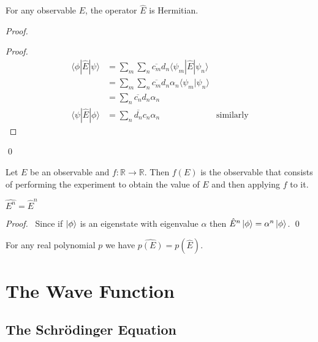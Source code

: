 \begin{prop}
For any observable $E$, the operator $\hat{E}$ is Hermitian.
\end{prop}

\begin{proof}
\pf
{}
\begin{proof}
	\pf
	\begin{align*}
		\langle \phi | \hat{E} | \psi \rangle
		& = \sum_m \sum_n \overline{c_m} d_n \langle \psi_m | \hat{E} | \psi_n \rangle \\
		& = \sum_m \sum_n \overline{c_m} d_n \alpha_n \langle \psi_m | \psi_n \rangle \\
		& = \sum_n \overline{c_n} d_n \alpha_n \\
		\langle \psi | \hat{E} | \phi \rangle & = \sum_n \overline{d_n} c_n \alpha_n & \text{similarly}
	\end{align*}
\end{proof}
\qed
\end{proof}

\begin{df}
Let $E$ be an observable and $f : \mathbb{R} \rightarrow \mathbb{R}$. Then $f(E)$ is the observable that consists of performing the experiment to obtain the value of $E$ and then applying $f$ to it.
\end{df}

\begin{prop}
$\widehat{E^n} = \hat{E}^n$
\end{prop}

\begin{proof}
\pf\ Since if $\left| {\phi} \right\rangle$ is an eigenstate with eigenvalue $\alpha$ then $\hat{E}^n \left| {\phi} \right\rangle = \alpha^n \left| {\phi} \right\rangle$. \qed
\end{proof}

\begin{cor}
For any real polynomial $p$ we have $\widehat{p(E)} = p(\hat{E})$.
\end{cor}

\chapter{The Wave Function}

\section{The Schr\"{o}dinger Equation}

